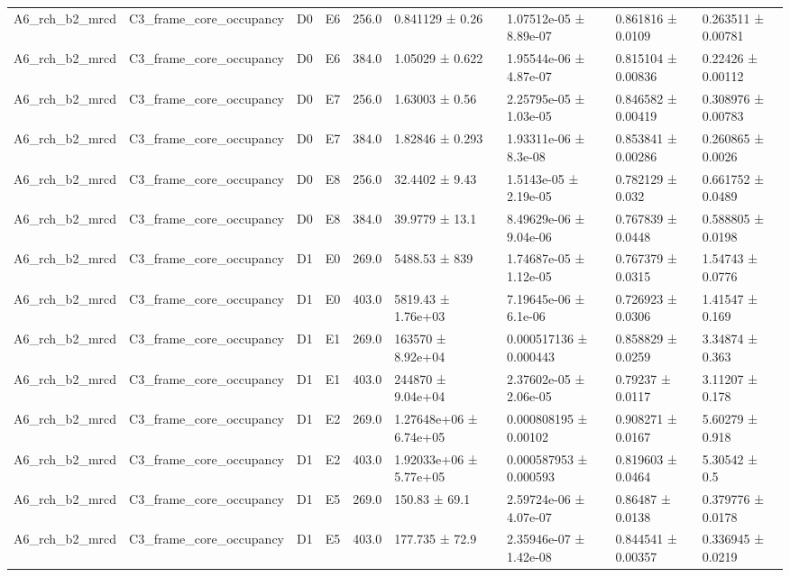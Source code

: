 \begin{table}
\begin{tabular}{lllllllll}
A6\_rch\_b2\_mrcd & C3\_frame\_core\_occupancy & D0 & E6 & 256.0 & 0.841129 ± 0.26 & 1.07512e-05 ± 8.89e-07 & 0.861816 ± 0.0109 & 0.263511 ± 0.00781 \\
A6\_rch\_b2\_mrcd & C3\_frame\_core\_occupancy & D0 & E6 & 384.0 & 1.05029 ± 0.622 & 1.95544e-06 ± 4.87e-07 & 0.815104 ± 0.00836 & 0.22426 ± 0.00112 \\
A6\_rch\_b2\_mrcd & C3\_frame\_core\_occupancy & D0 & E7 & 256.0 & 1.63003 ± 0.56 & 2.25795e-05 ± 1.03e-05 & 0.846582 ± 0.00419 & 0.308976 ± 0.00783 \\
A6\_rch\_b2\_mrcd & C3\_frame\_core\_occupancy & D0 & E7 & 384.0 & 1.82846 ± 0.293 & 1.93311e-06 ± 8.3e-08 & 0.853841 ± 0.00286 & 0.260865 ± 0.0026 \\
A6\_rch\_b2\_mrcd & C3\_frame\_core\_occupancy & D0 & E8 & 256.0 & 32.4402 ± 9.43 & 1.5143e-05 ± 2.19e-05 & 0.782129 ± 0.032 & 0.661752 ± 0.0489 \\
A6\_rch\_b2\_mrcd & C3\_frame\_core\_occupancy & D0 & E8 & 384.0 & 39.9779 ± 13.1 & 8.49629e-06 ± 9.04e-06 & 0.767839 ± 0.0448 & 0.588805 ± 0.0198 \\
A6\_rch\_b2\_mrcd & C3\_frame\_core\_occupancy & D1 & E0 & 269.0 & 5488.53 ± 839 & 1.74687e-05 ± 1.12e-05 & 0.767379 ± 0.0315 & 1.54743 ± 0.0776 \\
A6\_rch\_b2\_mrcd & C3\_frame\_core\_occupancy & D1 & E0 & 403.0 & 5819.43 ± 1.76e+03 & 7.19645e-06 ± 6.1e-06 & 0.726923 ± 0.0306 & 1.41547 ± 0.169 \\
A6\_rch\_b2\_mrcd & C3\_frame\_core\_occupancy & D1 & E1 & 269.0 & 163570 ± 8.92e+04 & 0.000517136 ± 0.000443 & 0.858829 ± 0.0259 & 3.34874 ± 0.363 \\
A6\_rch\_b2\_mrcd & C3\_frame\_core\_occupancy & D1 & E1 & 403.0 & 244870 ± 9.04e+04 & 2.37602e-05 ± 2.06e-05 & 0.79237 ± 0.0117 & 3.11207 ± 0.178 \\
A6\_rch\_b2\_mrcd & C3\_frame\_core\_occupancy & D1 & E2 & 269.0 & 1.27648e+06 ± 6.74e+05 & 0.000808195 ± 0.00102 & 0.908271 ± 0.0167 & 5.60279 ± 0.918 \\
A6\_rch\_b2\_mrcd & C3\_frame\_core\_occupancy & D1 & E2 & 403.0 & 1.92033e+06 ± 5.77e+05 & 0.000587953 ± 0.000593 & 0.819603 ± 0.0464 & 5.30542 ± 0.5 \\
A6\_rch\_b2\_mrcd & C3\_frame\_core\_occupancy & D1 & E5 & 269.0 & 150.83 ± 69.1 & 2.59724e-06 ± 4.07e-07 & 0.86487 ± 0.0138 & 0.379776 ± 0.0178 \\
A6\_rch\_b2\_mrcd & C3\_frame\_core\_occupancy & D1 & E5 & 403.0 & 177.735 ± 72.9 & 2.35946e-07 ± 1.42e-08 & 0.844541 ± 0.00357 & 0.336945 ± 0.0219 \\

\end{tabular}
\end{table}
